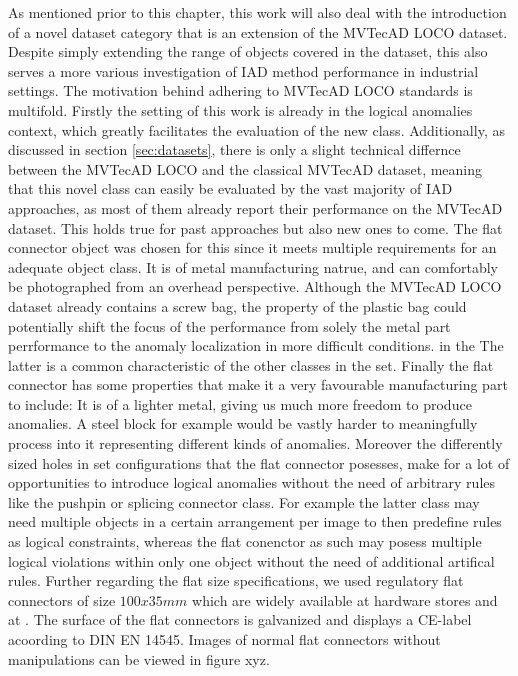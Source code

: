 As mentioned prior to this chapter, this work will also deal with the introduction of a novel dataset category that is an extension of the MVTecAD LOCO \cite{LOCODentsAndScratchesBergmann2022} dataset. 
Despite simply extending the range of objects covered in the dataset, this also serves a more various investigation of IAD method performance in industrial settings. The motivation behind adhering 
to MVTecAD LOCO standards is multifold. Firstly the setting of this work is already in the logical anomalies context, which greatly facilitates the evaluation of the new class. Additionally, as 
discussed in section \ref{sec:datasets}, there is only a slight technical differnce between the MVTecAD LOCO and the classical MVTecAD \cite{MVTEC_Bergmann_2021} dataset, meaning that this novel 
class can easily be evaluated by the vast majority of IAD approaches, as most of them already report their performance on the MVTecAD dataset. This holds true for past approaches but also new ones 
to come.
\newline\newline
The flat connector object was chosen for this since it meets multiple requirements for an adequate object class. It is of metal manufacturing natrue, and can comfortably be photographed from 
an overhead perspective. Although the MVTecAD LOCO dataset already contains a screw bag, the property of the plastic bag could potentially shift the focus of the performance from solely the metal 
part perrformance to the anomaly localization in more difficult conditions. in the The latter is a common characteristic of the other classes in the set. Finally the flat connector has some 
properties that make it a very favourable manufacturing part to include: It is of a lighter metal, giving us much more freedom to produce anomalies. A steel block for example would be vastly 
harder to meaningfully process into it representing different kinds of anomalies. Moreover the differently sized holes in set configurations that the flat connector posesses, make for a lot of opportunities 
to introduce logical anomalies without the need of arbitrary rules like the pushpin or splicing connector class. For example the latter class may need multiple objects in a certain arrangement per image to then predefine 
rules as logical constraints, whereas the flat conenctor as such may posess multiple logical violations within only one object without the need of additional artifical rules.
\newline
Further regarding the flat size specifications, we used regulatory flat 
connectors of size $100x35 mm$ which are widely available at hardware stores and at \cite{flatconnectorlink}. The surface of the flat connectors is galvanized 
and displays a CE-label acoording to DIN EN 14545. Images of normal flat connectors without manipulations can be viewed in figure xyz.


